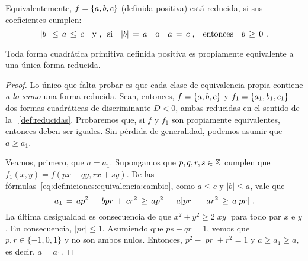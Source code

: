 \begin{obsReducidas}\label{obs:reducidas:definicion}
	Equivalentemente, $f=\left\{a,b,c\right\}$ (definida positiva)
	est\'a reducida, si sus coeficientes cumplen:
	\begin{displaymath}
		|b|\,\leq\,a\,\leq\,c\quad\text{y~,~~si}\quad
		|b|\,=\,a\quad\text{o}\quad a\,=\,c\text{ ,}
		\quad\text{entonces}\quad
		b\,\geq\,0
		\text{ .}
	\end{displaymath}
\end{obsReducidas}

\begin{teoReducidas}\label{teo:reducidas}
	Toda forma cuadr\'atica primitiva definida positiva es
	propiamente equivalente a una \'unica forma reducida.
\end{teoReducidas}

\begin{proof}
	Lo \'unico que falta probar es que cada clase de equivalencia
	propia contiene \emph{a lo sumo} una forma reducida.
	Sean, entonces, $f=\left\{a,b,c\right\}$ y $f_1=\left\{a_1,b_1,c_1\right\}$
	dos formas cuadr\'aticas de discriminante $D<0$, ambas reducidas
	en el sentido de la ~\ref{def:reducidas}.
	Probaremos que, si $f$ y $f_1$ son propiamente equivalentes,
	entonces deben ser iguales.
	Sin p\'erdida de generalidad, podemos asumir que $a\geq a_1$.	

	Veamos, primero, que $a=a_1$. Supongamos que $p,q,r,s\in\mathbb{Z}$
	cumplen que
	\begin{math}
		f_1(x,y)=f(px+qy,rx+sy)
	\end{math}.
	De las f\'ormulas~\eqref{eq:definiciones:equivalencia:cambio},
	como $a\leq c$ y $|b|\leq a$, vale que
	\begin{displaymath}
		a_1\,=\,ap^2\,+\,bpr\,+\,cr^2
		\,\geq\,ap^2\,-\,a|pr|\,+\,ar^2\,\geq\,a|pr|
		\text{ .}
	\end{displaymath}
	La \'ultima desigualdad es consecuencia de que
	$x^2+y^2\geq 2|xy|$ para todo par $x$ e $y$. En consecuencia,
	$|pr|\leq 1$. Asumiendo que $ps-qr=1$, vemos que
	$p,r\in\{-1,0,1\}$ y no son ambos nulos.
	Entonces, $p^2-|pr|+r^2=1$ y $a\geq a_1\geq a$, es decir, $a=a_1$.


\end{proof}
